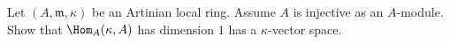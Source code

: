 \begin{exercise}[Injectives]
\label{exercise-injective-artinian-local}
Let $(A, \mathfrak m, \kappa)$ be an Artinian local ring.
Assume $A$ is injective as an $A$-module. Show that
$\Hom_A(\kappa, A)$ has dimension $1$ has a
$\kappa$-vector space.
\end{exercise}












